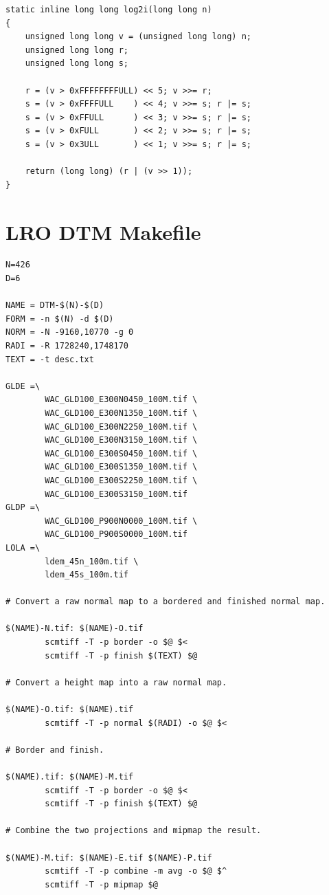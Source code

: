 \documentclass[oneside,10pt]{memoir}
\begin{document}
\begin{Spacing}{1.1}
\begin{Verbatim}
static inline long long log2i(long long n)
{
    unsigned long long v = (unsigned long long) n;
    unsigned long long r;
    unsigned long long s;

    r = (v > 0xFFFFFFFFULL) << 5; v >>= r;
    s = (v > 0xFFFFULL    ) << 4; v >>= s; r |= s;
    s = (v > 0xFFULL      ) << 3; v >>= s; r |= s;
    s = (v > 0xFULL       ) << 2; v >>= s; r |= s;
    s = (v > 0x3ULL       ) << 1; v >>= s; r |= s;

    return (long long) (r | (v >> 1));
}
\end{Verbatim}


\chapter{LRO DTM Makefile}
\label{cha:makefile}

\begin{Verbatim}
N=426
D=6

NAME = DTM-$(N)-$(D)
FORM = -n $(N) -d $(D)
NORM = -N -9160,10770 -g 0
RADI = -R 1728240,1748170
TEXT = -t desc.txt

GLDE =\
        WAC_GLD100_E300N0450_100M.tif \
        WAC_GLD100_E300N1350_100M.tif \
        WAC_GLD100_E300N2250_100M.tif \
        WAC_GLD100_E300N3150_100M.tif \
        WAC_GLD100_E300S0450_100M.tif \
        WAC_GLD100_E300S1350_100M.tif \
        WAC_GLD100_E300S2250_100M.tif \
        WAC_GLD100_E300S3150_100M.tif
GLDP =\
        WAC_GLD100_P900N0000_100M.tif \
        WAC_GLD100_P900S0000_100M.tif
LOLA =\
        ldem_45n_100m.tif \
        ldem_45s_100m.tif

# Convert a raw normal map to a bordered and finished normal map.

$(NAME)-N.tif: $(NAME)-O.tif
        scmtiff -T -p border -o $@ $<
        scmtiff -T -p finish $(TEXT) $@

# Convert a height map into a raw normal map.

$(NAME)-O.tif: $(NAME).tif
        scmtiff -T -p normal $(RADI) -o $@ $<

# Border and finish.

$(NAME).tif: $(NAME)-M.tif
        scmtiff -T -p border -o $@ $<
        scmtiff -T -p finish $(TEXT) $@

# Combine the two projections and mipmap the result.

$(NAME)-M.tif: $(NAME)-E.tif $(NAME)-P.tif
        scmtiff -T -p combine -m avg -o $@ $^
        scmtiff -T -p mipmap $@


\end{Verbatim}
\end{Spacing}
\end{document}
